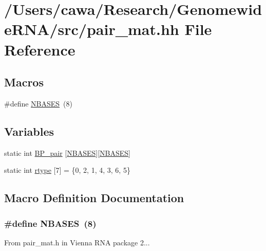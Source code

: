 \hypertarget{pair__mat_8hh}{\section{/\+Users/cawa/\+Research/\+Genomewide\+R\+N\+A/src/pair\+\_\+mat.hh File Reference}
\label{pair__mat_8hh}
}
\subsection*{Macros}
\begin{DoxyCompactItemize}
\item 
\#define \hyperlink{pair__mat_8hh_ad554b4852cd5fec35025db8edbbba3cd}{N\+B\+A\+S\+E\+S}~(8)
\end{DoxyCompactItemize}
\subsection*{Variables}
\begin{DoxyCompactItemize}
\item 
static int \hyperlink{pair__mat_8hh_a4d0b503b0d6831ff671757e5b196ed14}{B\+P\+\_\+pair} \mbox{[}\hyperlink{pair__mat_8hh_ad554b4852cd5fec35025db8edbbba3cd}{N\+B\+A\+S\+E\+S}\mbox{]}\mbox{[}\hyperlink{pair__mat_8hh_ad554b4852cd5fec35025db8edbbba3cd}{N\+B\+A\+S\+E\+S}\mbox{]}
\item 
static int \hyperlink{pair__mat_8hh_a0c7d147d8a3269289b4d69479e7f8fa6}{rtype} \mbox{[}7\mbox{]} = \{0, 2, 1, 4, 3, 6, 5\}
\end{DoxyCompactItemize}


\subsection{Macro Definition Documentation}
\hypertarget{pair__mat_8hh_ad554b4852cd5fec35025db8edbbba3cd}{
\subsubsection[{N\+B\+A\+S\+E\+S}]{\setlength{\rightskip}{0pt plus 5cm}\#define N\+B\+A\+S\+E\+S~(8)}}\label{pair__mat_8hh_ad554b4852cd5fec35025db8edbbba3cd}
From pair\+\_\+mat.\+h in Vienna R\+N\+A package 2... 

